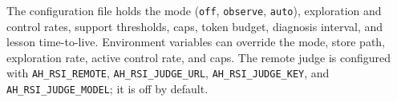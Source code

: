 The configuration file holds the mode (\texttt{off}, \texttt{observe}, \texttt{auto}), exploration and control rates, support thresholds, caps, token budget, diagnosis interval, and lesson time-to-live. Environment variables can override the mode, store path, exploration rate, active control rate, and caps. The remote judge is configured with \texttt{AH\_RSI\_REMOTE}, \texttt{AH\_RSI\_JUDGE\_URL}, \texttt{AH\_RSI\_JUDGE\_KEY}, and \texttt{AH\_RSI\_JUDGE\_MODEL}; it is off by default.
